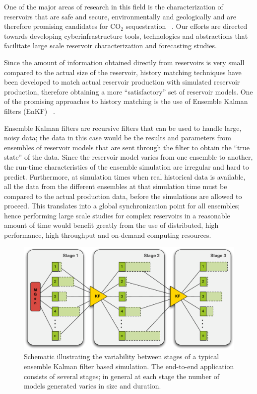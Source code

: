 \documentclass[a4paper,10pt]{article}
\begin{document}
One of the major areas of research in this field is the characterization of reservoirs that are safe and secure, environmentally and geologically and are therefore promising candidates for CO$_2$ sequestration ~\cite{GeoRPT,Luigi}. Our efforts are directed towards developing cyberinfrastructure tools, technologies and abstractions that facilitate large scale reservoir characterization and forecasting studies.

Since the amount of information obtained directly from reservoirs is very small compared to the actual size of the reservoir, history matching techniques have been developed to match actual reservoir production with simulated reservoir production, therefore obtaining a more ``satisfactory'' set of reservoir models. One of the promising approaches to history matching is the use of Ensemble Kalman filters (EnKF) ~\cite{KalmanPaper, DO2007, LiEnKF07, DO2006}.

Ensemble Kalman filters are recursive filters that can be used to handle large, noisy data; the data in this case would be the results and parameters from ensembles of reservoir models that are sent through the filter to obtain the ``true state'' of the data. Since the reservoir model varies from one ensemble to another, the run-time characteristics of the ensemble simulation are irregular and hard to predict. Furthermore, at simulation times when real historical data is available, all the data from the different ensembles at that simulation time must be compared to the actual production data, before the simulations are allowed to proceed. This translates into a global synchronization point for all ensembles; hence performing large scale studies for complex reservoirs in a reasonable amount of time would benefit greatly from the use of distributed, high performance, high throughput and on-demand computing resources.

\begin{figure}
\begin{center}
\includegraphics*[scale=0.4,angle=0]{3StageKalmanFilter}
\end{center}
\caption{Schematic illustrating the variability between stages of a typical
  ensemble Kalman filter based simulation. The end-to-end
  application consists of several stages; in general at each stage the
  number of models generated varies in size and duration.}
\label{fig:irregular_execution}
\end{figure}
\end{document}
